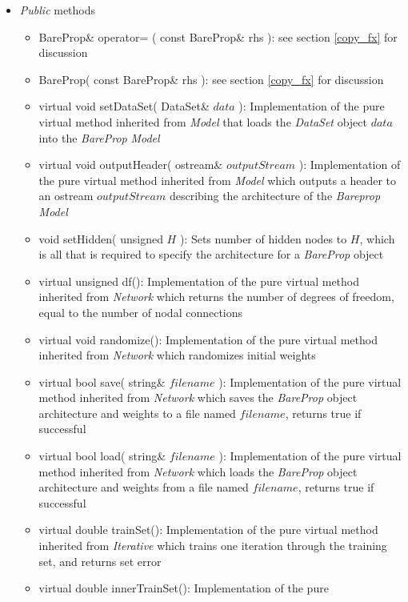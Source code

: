 \documentclass{report}
\begin{document}
\begin{itemize}

\item {\em Public} methods

\begin{itemize}
\item BareProp\& operator= ( const BareProp\& rhs ): see section
      \ref{copy_fx} for discussion
\item BareProp( const BareProp\& rhs ): see section \ref{copy_fx} for
      discussion
\item virtual void setDataSet( DataSet\& $data$ ): Implementation of
      the pure virtual method inherited from {\em Model} that loads
      the {\em DataSet} object $data$ into the {\em BareProp} {\em
      Model}
\item virtual void outputHeader( ostream\& $outputStream$ ):
      Implementation of the pure virtual method inherited from {\em
      Model} which outputs a header to an ostream $outputStream$
      describing the architecture of the {\em Bareprop} {\em Model}
\item void setHidden( unsigned $H$ ): Sets number of hidden nodes to
      $H$, which is all that is required to specify the architecture
      for a {\em BareProp} object
\item virtual unsigned df(): Implementation of the pure virtual method
      inherited from {\em Network} which returns the number of degrees
      of freedom, equal to the number of nodal connections
\item virtual void randomize(): Implementation of the pure virtual
      method inherited from {\em Network} which randomizes initial
      weights
\item virtual bool save( string\& $filename$ ): Implementation of the
      pure virtual method inherited from {\em Network} which saves the
      {\em BareProp} object architecture and weights to a file named
      $filename$, returns true if successful
\item virtual bool load( string\& $filename$ ): Implementation of the
      pure virtual method inherited from {\em Network} which loads the
      {\em BareProp} object architecture and weights from a file named
      $filename$, returns true if successful
\item virtual double trainSet(): Implementation of the pure virtual
      method inherited from {\em Iterative} which trains one iteration
      through the training set, and returns set error
\item virtual double innerTrainSet(): Implementation of the pure

\end{itemize}
\end{itemize}
\end{document}
